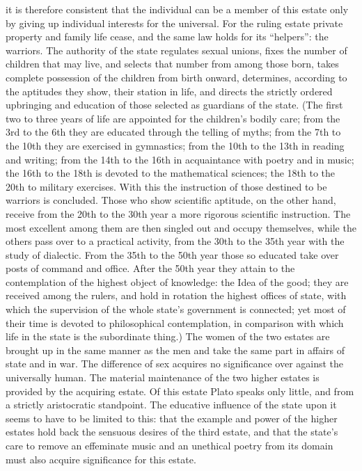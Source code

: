 it is therefore consistent that the individual can be a member of this estate only by giving up individual interests
for the universal. For the ruling estate private property and family life cease, and the same law holds for its
``helpers'': the warriors. The authority of the state regulates sexual unions, fixes the number of children that may live, and selects that number from among those born, takes complete possession of the children
from birth onward, determines, according to the aptitudes they show, their
station in life, and directs the strictly
ordered upbringing and education of those selected as guardians of the state. (The first two to three years of life are appointed for the children's bodily care; from the 3rd to
the 6th they are educated through the telling of myths; from the 7th
to the 10th they are exercised in gymnastics; from the 10th to the 13th
in reading and writing; from the 14th to the 16th in acquaintance with
poetry and in music; the 16th to the 18th is devoted to
the mathematical sciences; the 18th to the 20th to military exercises. With this the instruction of those destined to be warriors is concluded. Those who show scientific aptitude, on the other hand, receive
from the 20th to the 30th year a more rigorous scientific instruction. The most excellent among them are then singled
out and occupy themselves, while the others pass over to
a practical activity, from the 30th to the 35th year with
the study of dialectic. From the 35th to the 50th year those so educated take over posts of command and office.
After the 50th year they attain to the contemplation of the highest
object of knowledge: the Idea of the good; they are received among the rulers, and hold in rotation the highest offices of state,
with which the supervision of the whole state's government is connected;
yet most of their time is devoted to philosophical contemplation, in comparison with which life in the state is the
subordinate thing.) The women of the two estates are brought up in the
same manner as the men and take the same part in affairs of state and in war. The difference of sex acquires no significance
over against the universally human. The material maintenance of the two higher estates
is provided by the acquiring estate.
Of this estate Plato speaks only little, and from a strictly aristocratic standpoint. The educative influence of the state upon it
seems to have to be limited to this: that the example and power of the higher estates
hold back the sensuous desires of the third estate, and that the state's care to remove an effeminate music and an unethical poetry from its domain must also acquire
significance for this estate.

